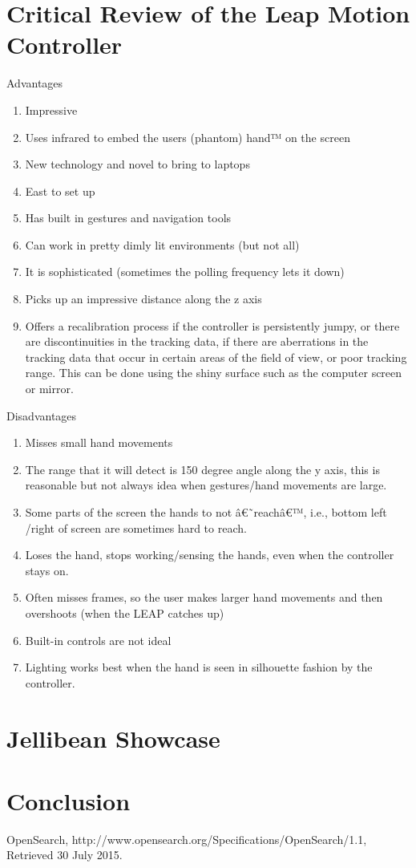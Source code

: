 \documentclass[a4paper, 11pt]{article}
\begin{document}
\section {Critical Review of the Leap Motion Controller}
Advantages
\begin{enumerate}
\item{Impressive}
\item{Uses infrared to embed the users (phantom) hand™ on the screen}
\item{New technology and novel to bring to laptops}
\item{East to set up}
\item{Has built in gestures and navigation tools}
\item{Can work in pretty dimly lit environments (but not all)}
\item{It is sophisticated (sometimes the polling frequency lets it down)}
\item{Picks up an impressive distance along the z axis}
\item{Offers a recalibration process if the controller is persistently jumpy, or there are discontinuities in the tracking data, if there are aberrations in the tracking data that occur in certain areas of the field of view, or poor tracking range. This can be done using the shiny surface such as the computer screen or mirror.}
\end{enumerate}	
Disadvantages
\begin{enumerate}
\item{Misses small hand movements}
\item{The range that it will detect is 150 degree angle along the y axis, this is reasonable but not always idea when gestures/hand movements are large.}
\item{Some parts of the screen the hands to not â€˜reachâ€™, i.e., bottom left /right of screen are sometimes hard to reach.}
\item{Loses the hand, stops working/sensing the hands, even when the controller stays on.}
\item{Often misses frames, so the user makes larger hand movements and then overshoots (when the LEAP catches up)}
\item{Built-in controls are not ideal}
\item{Lighting works best when the hand is seen in silhouette fashion by the controller. }
\end{enumerate}

\section{Jellibean Showcase}

\section{Conclusion}

\clearpage
\begin{thebibliography}{100}
OpenSearch, http://www.opensearch.org/Specifications/OpenSearch/1.1, Retrieved 30 July 2015.
\end{thebibliography}
\end{document}
